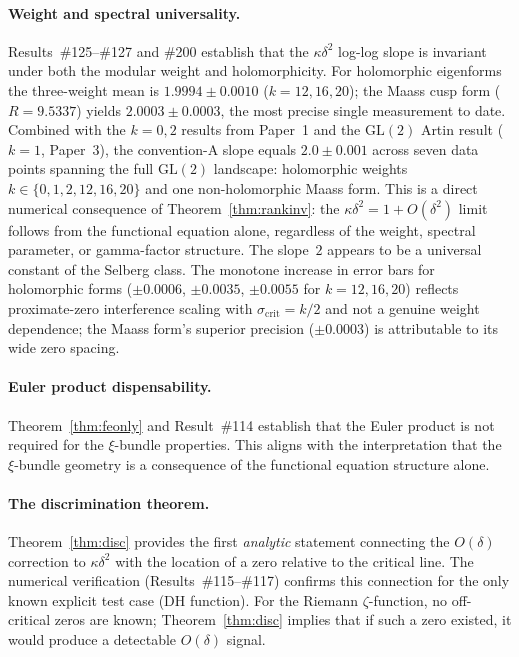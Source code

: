 \documentclass[11pt, a4paper]{article}
\theoremstyle{plain}
\theoremstyle{definition}
\begin{document}
\paragraph{Weight and spectral universality.}
Results~\#125--\#127 and \#200 establish that the $\kappa\delta^{2}$ log-log
slope is invariant under both the modular weight and holomorphicity.
For holomorphic eigenforms the three-weight mean is $1.9994\pm 0.0010$
($k=12,16,20$); the Maass cusp form ($R=9.5337$) yields
$2.0003\pm 0.0003$, the most precise single measurement to date.  Combined
with the $k=0,2$ results from Paper~1 and the $\mathrm{GL}(2)$ Artin
result ($k=1$, Paper~3), the convention-A slope equals $2.0\pm 0.001$ across
seven data points spanning the full $\mathrm{GL}(2)$ landscape: holomorphic
weights $k\in\{0,1,2,12,16,20\}$ and one non-holomorphic Maass form.
This is a direct numerical consequence of Theorem~\ref{thm:rankinv}: the
$\kappa\delta^{2}=1+O(\delta^{2})$ limit follows from the functional
equation alone, regardless of the weight, spectral parameter, or
gamma-factor structure.  The slope~$2$ appears to be a universal constant
of the Selberg class.  The monotone increase in error bars for holomorphic
forms ($\pm0.0006$, $\pm0.0035$, $\pm0.0055$ for $k=12,16,20$) reflects
proximate-zero interference scaling with $\sigma_{\mathrm{crit}}=k/2$ and
not a genuine weight dependence; the Maass form's superior precision
($\pm 0.0003$) is attributable to its wide zero spacing.

\paragraph{Euler product dispensability.}
Theorem~\ref{thm:feonly} and Result~\#114 establish that the Euler
product is not required for the $\xi$-bundle properties.  This aligns
with the interpretation that the $\xi$-bundle geometry is a consequence
of the functional equation structure alone.

\paragraph{The discrimination theorem.}
Theorem~\ref{thm:disc} provides the first \emph{analytic} statement
connecting the $O(\delta)$ correction to $\kappa\delta^{2}$ with the
location of a zero relative to the critical line.  The numerical
verification (Results~\#115--\#117) confirms this connection for the
only known explicit test case (DH function).  For the Riemann
$\zeta$-function, no off-critical zeros are known; Theorem~\ref{thm:disc}
implies that if such a zero existed, it would produce a detectable
$O(\delta)$ signal.
\end{document}
